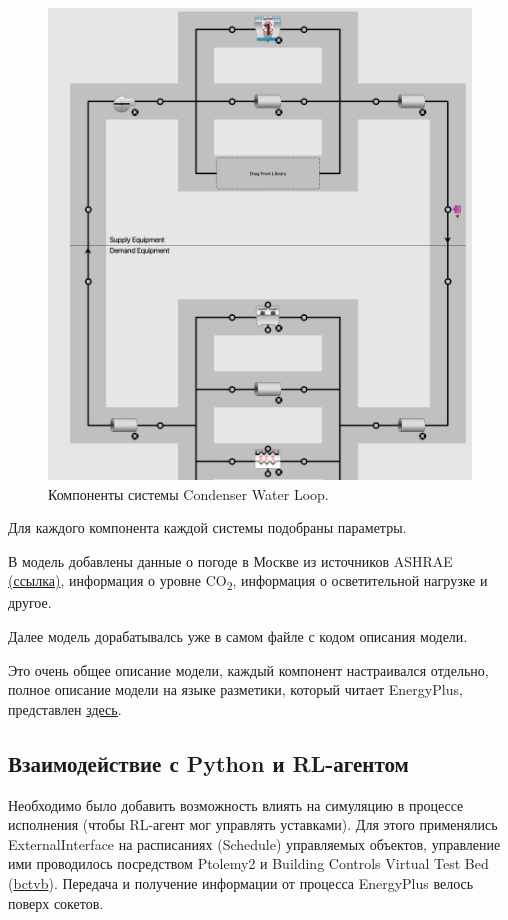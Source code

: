 \documentclass{article}
\begin{document}
\begin{figure}[h!]
\centering
\includegraphics[width=0.95\linewidth]{figures/CRAH3.png}
\caption{Компоненты системы Condenser Water Loop.}
\label{fig:CRAH3}
\end{figure}

Для каждого компонента каждой системы подобраны параметры.

В модель добавлены данные о погоде в Москве из источников ASHRAE \href{https://energyplus.net/weather-location/europe_wmo_region_6/RUS/RUS_Moscow.276120_IWEC }{(ссылка)}, информация о уровне CO\textsubscript{2}, информация о осветительной нагрузке и другое.

Далее модель дорабатывалсь уже в самом файле с кодом описания модели.

Это очень общее описание модели, каждый компонент настраивался отдельно, полное описание модели на языке разметики, который читает EnergyPlus, представлен \href{https://github.com/koshachya-myata/Data_Center_Simulation/blob/main/src/dc_env/buildings/MultiZone_DC_wHot_nCold_Aisles/MultiZone_DC.idf}{здесь}.

\subsection{Взаимодействие с Python и RL-агентом}
Необходимо было добавить возможность влиять на симуляцию в процессе исполнения (чтобы RL-агент мог управлять уставками). Для этого применялись ExternalInterface на расписаниях (Schedule) управляемых объектов, управление ими проводилось посредством Ptolemy2 и Building Controls Virtual Test Bed (\href{https://github.com/lbl-srg/bcvtb }{bctvb}). Передача и получение информации от процесса EnergyPlus велось поверх сокетов.
\end{document}

